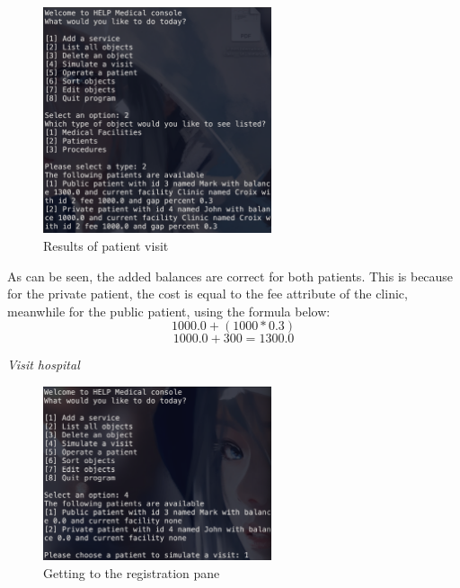 \documentclass{article}
\begin{document}
	\begin{figure}
		\begin{center}
			\includegraphics[width=0.6\textwidth]{figures/Visiting/Result_patient_visit.png}
		\end{center}
		\caption{Results of patient visit}\label{fig:result_patient_visit}
	\end{figure}

	As can be seen, the added balances are correct for both patients. This is because for the private patient, the cost is equal to the fee attribute of the clinic, meanwhile for the public patient, using the formula below: 
	\[
		1000.0 + (1000 * 0.3)
	\]
	\[
		1000.0 + 300 = 1300.0
	\]


	\newpage 

	\textit{Visit hospital}
	\begin{figure}
		\begin{center}
			\includegraphics[width=0.6\textwidth]{figures/Visiting/Register_hospital_01.png}
		\end{center}
		\caption{Getting to the registration pane}\label{fig:register_hospital_01}
	\end{figure}
\end{document}
